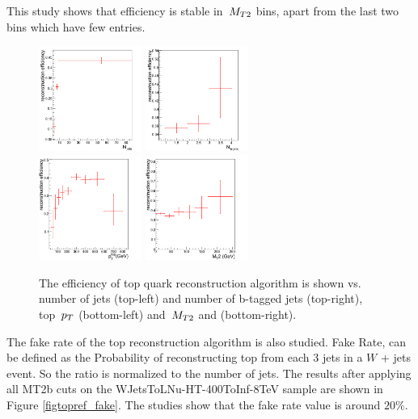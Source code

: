 This study shows that efficiency is stable in $\,{M_{T2}}$ bins, apart from the last two bins which have few entries.

\begin{figure}[htbp] 
\centering
    \includegraphics[width=0.3\textwidth]{figs/topNjet.pdf}
    \includegraphics[width=0.3\textwidth]{figs/topNbjet.pdf} \\
    \includegraphics[width=0.3\textwidth]{figs/topPt.pdf}
    \includegraphics[width=0.3\textwidth]{figs/topMT2.pdf}
    \caption{The efficiency of top quark reconstruction algorithm is shown vs. number of jets (top-left) and number of
b-tagged jets (top-right), top $\,p_T$ (bottom-left) and $\,{M_{T2}}$  and (bottom-right).}
    \label{figtopref_eff}
\end{figure}


The fake rate of the top reconstruction algorithm is also studied. Fake Rate, can be defined as the Probability of reconstructing top from each 3 jets in a $W$ + jets event. So the ratio is normalized to the number of jets. The results after applying all MT2b cuts on the WJetsToLNu-HT-400ToInf-8TeV sample are shown in Figure \ref{figtopref_fake}. The studies show that the fake rate value is around $20\%$.



